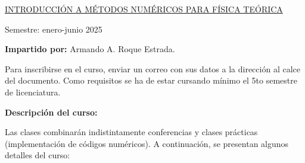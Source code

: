\documentclass[12pt]{amsart} %
\begin{document}

\uline{\normalsize{INTRODUCCIÓN A  MÉTODOS NUMÉRICOS PARA FÍSICA TEÓRICA}}%

\vspace{14pt}

\large{Semestre: enero-junio 2025}

\vspace{14pt}


\textbf{Impartido por:} Armando A. Roque Estrada.
\vspace{8pt}

Para inscribirse en el curso, enviar un correo con sus datos a la dirección al calce del documento. Como requisitos se ha de estar cursando mínimo el 5to semestre de licenciatura.

\vspace{8pt}


\textbf{Descripción del curso:}
 \vspace{8pt}
 
Las clases combinarán indistintamente conferencias y clases prácticas (implementación de códigos numéricos). A continuación, se presentan algunos detalles del curso:
\vspace{8pt}
\end{document}
